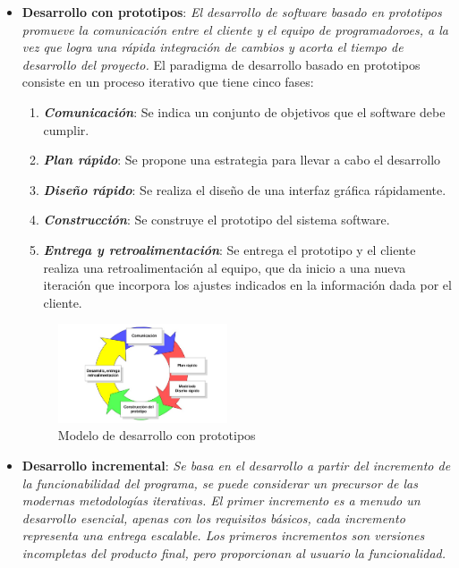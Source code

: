 \begin{itemize}
    \item \textbf{Desarrollo con prototipos}: \textit{El desarrollo de software basado en prototipos promueve la comunicación entre el cliente
    y el equipo de programadoroes, a la vez que logra una rápida integración de cambios y acorta el tiempo de desarrollo del proyecto.}
    \autocite*{RoqueHernandez2015} El paradigma de desarrollo basado en prototipos consiste en un proceso iterativo que tiene cinco 
    fases:
    \newpage
    \begin{enumerate}
        \item \textbf{\textit{Comunicación}}: Se indica un conjunto de objetivos que el software debe cumplir.
        \item \textbf{\textit{Plan rápido}}: Se propone una estrategia para llevar a cabo el desarrollo
        \item \textbf{\textit{Diseño rápido}}: Se realiza el diseño de una interfaz gráfica rápidamente.
        \item \textbf{\textit{Construcción}}: Se construye el prototipo del sistema software.
        \item \textbf{\textit{Entrega y retroalimentación}}: Se entrega el prototipo y el cliente realiza una 
        retroalimentación al equipo, que da inicio a una nueva iteración que incorpora los ajustes indicados en la 
        información dada por el cliente.
    \end{enumerate}\medskip
    
    \begin{figure}[H]
        \centering
        \includegraphics[width=5cm]{Figures/modelo_prototipos.jpeg}
        \caption{Modelo de desarrollo con prototipos \autocite*{ModeloPrototipos}}
    \end{figure}

    \item \textbf{Desarrollo incremental}: \textit{Se basa en el desarrollo a partir del incremento de la funcionabilidad 
    del programa, se puede considerar un precursor de las modernas metodologías iterativas. El primer incremento es 
    a menudo un desarrollo esencial, apenas con los requisitos básicos, cada incremento representa una entrega
    escalable. Los primeros incrementos son versiones incompletas del producto final, pero proporcionan al 
    usuario la funcionalidad.} \autocite*{Zumba2018} \medskip


\end{itemize}
